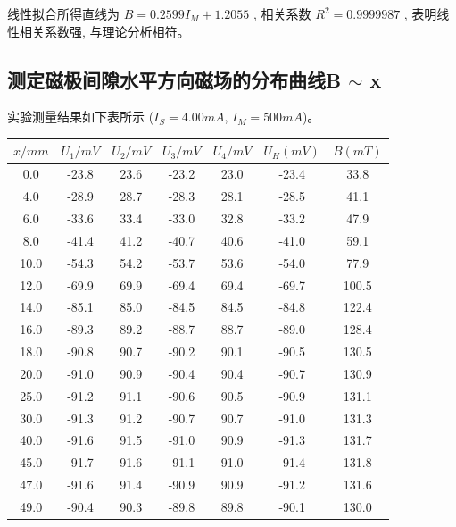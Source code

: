 \documentclass[UTF8]{ctexart}
\begin{document}
线性拟合所得直线为 $ B=0.2599 I_{M}+1.2055$ , 相关系数 $ R^{2}=0.9999987$ , 表明线性相关系数强, 与理论分析相符。


\subsection{测定磁极间隙水平方向磁场的分布曲线B $\sim$ x}

实验测量结果如下表所示 ($I_S = 4.00mA$, $I_M = 500mA$)。

\begin{center}
  
  \begin{tabular}{c|c|c|c|c|c|c}
    \hline $x/mm$ & $U_1/mV$ & $U_2/mV$ & $U_3/mV $ & $U_4/mV$ &$U_H(mV)$ & $B(mT)$ \\
    \hline
    0.0   & -23.8 & 23.6  & -23.2 & 23.0  & -23.4 & 33.8 \\
    \hline
    4.0   & -28.9 & 28.7  & -28.3 & 28.1  & -28.5 & 41.1 \\
    \hline
    6.0   & -33.6 & 33.4  & -33.0 & 32.8  & -33.2 & 47.9 \\
    \hline
    8.0   & -41.4 & 41.2  & -40.7 & 40.6  & -41.0 & 59.1 \\
    \hline
    10.0  & -54.3 & 54.2  & -53.7 & 53.6  & -54.0 & 77.9 \\
    \hline
    12.0  & -69.9 & 69.9  & -69.4 & 69.4  & -69.7 & 100.5 \\
    \hline
    14.0  & -85.1 & 85.0  & -84.5 & 84.5  & -84.8 & 122.4 \\
    \hline
    16.0  & -89.3 & 89.2  & -88.7 & 88.7  & -89.0 & 128.4 \\
    \hline
    18.0  & -90.8 & 90.7  & -90.2 & 90.1  & -90.5 & 130.5 \\
    \hline
    20.0  & -91.0 & 90.9  & -90.4 & 90.4  & -90.7 & 130.9 \\
    \hline
    25.0  & -91.2 & 91.1  & -90.6 & 90.5  & -90.9 & 131.1 \\
    \hline
    30.0  & -91.3 & 91.2  & -90.7 & 90.7  & -91.0 & 131.3 \\
    \hline
    40.0  & -91.6 & 91.5  & -91.0 & 90.9  & -91.3 & 131.7 \\
    \hline
    45.0  & -91.7 & 91.6  & -91.1 & 91.0  & -91.4 & 131.8 \\
    \hline
    47.0  & -91.6 & 91.4  & -90.9 & 90.9  & -91.2 & 131.6 \\
    \hline
    49.0  & -90.4 & 90.3  & -89.8 & 89.8  & -90.1 & 130.0 \\
    \hline

\end{tabular}
\end{center}
\end{document}
